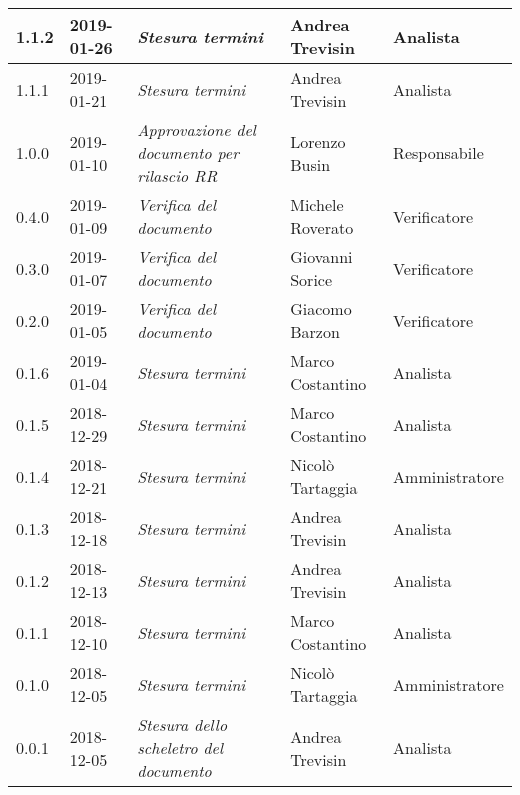 \begin{longtable}{C{2cm}|C{2.5cm}|C{4.5cm}|C{2.5cm}|C{3cm}}
		1.1.2 & 2019-01-26 & \emph{Stesura termini} & Andrea Trevisin & Analista \\
		\hline
	
		1.1.1 & 2019-01-21 & \emph{Stesura termini} & Andrea Trevisin & Analista \\
		\hline
		
		1.0.0 & 2019-01-10 & \emph{Approvazione del documento per rilascio RR} & Lorenzo Busin & Responsabile \\
		\hline
		
		0.4.0 & 2019-01-09 & \emph{Verifica del documento} & Michele Roverato & Verificatore \\
		\hline
		
		0.3.0 & 2019-01-07 & \emph{Verifica del documento} & Giovanni Sorice & Verificatore \\
		\hline
		
		0.2.0 & 2019-01-05 & \emph{Verifica del documento} & Giacomo Barzon & Verificatore \\
		\hline
		
		0.1.6 & 2019-01-04 & \emph{Stesura termini} & Marco Costantino & Analista \\
		\hline
		
		0.1.5 & 2018-12-29 & \emph{Stesura termini} & Marco Costantino & Analista \\
		\hline
		
		0.1.4 & 2018-12-21 & \emph{Stesura termini} & Nicolò Tartaggia & Amministratore \\
		\hline
		
		0.1.3 & 2018-12-18 & \emph{Stesura termini} & Andrea Trevisin & Analista \\
		\hline
		
		0.1.2 & 2018-12-13 & \emph{Stesura termini} & Andrea Trevisin & Analista \\
		\hline
		
		0.1.1 & 2018-12-10 & \emph{Stesura termini} & Marco Costantino & Analista \\
		\hline
		
		0.1.0 & 2018-12-05 & \emph{Stesura termini} & Nicolò Tartaggia & Amministratore \\
		\hline
		
		0.0.1 & 2018-12-05 & \emph{Stesura dello scheletro del documento} & Andrea Trevisin & Analista \\
		
	\end{longtable}


\clearpage
